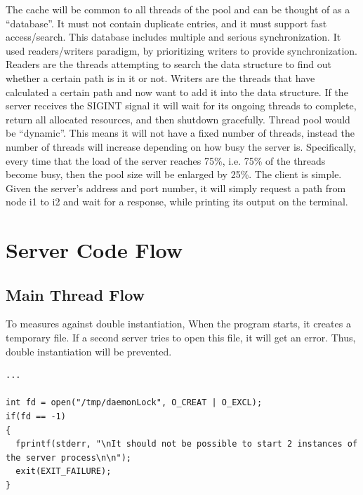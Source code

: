 \documentclass{article}
\begin{document}
\newline \newline The cache will be common to all threads of the pool and can be thought of as a “database”. It must not contain duplicate entries, and it must support fast access/search. This database includes multiple and serious synchronization. It used readers/writers paradigm, by prioritizing writers to provide synchronization. Readers are the threads attempting to search the data structure to find out whether a certain path is in it or not. Writers are the threads that have calculated a certain path and now want to add it into the data structure.
\newline \newline If the server receives the SIGINT signal it will wait for its ongoing threads to complete, return all allocated resources, and then shutdown gracefully.
\newline \newline Thread pool would be “dynamic”. This means it will not have a fixed number of threads, instead the number of threads will increase depending on how busy the server is. Specifically, every time that the load of the server reaches 75\%, i.e. 75\% of the threads become busy,  then the pool size will be enlarged by 25\%.
\newline \newline The client is simple. Given the server’s address and port number, it will simply request a path from node i1 to i2 and wait for a response, while printing its output on the terminal.

\section{Server Code Flow}
\subsection{Main Thread Flow}
\noindent To measures against double instantiation,  When the program starts, it creates a temporary file. If a second server tries to open this file, it will get an error. Thus, double instantiation will be prevented.

\begin{lstlisting}[style=CStyle]
...

int fd = open("/tmp/daemonLock", O_CREAT | O_EXCL);
if(fd == -1)
{
  fprintf(stderr, "\nIt should not be possible to start 2 instances of the server process\n\n");
  exit(EXIT_FAILURE);
}
\end{lstlisting}
\end{document}
